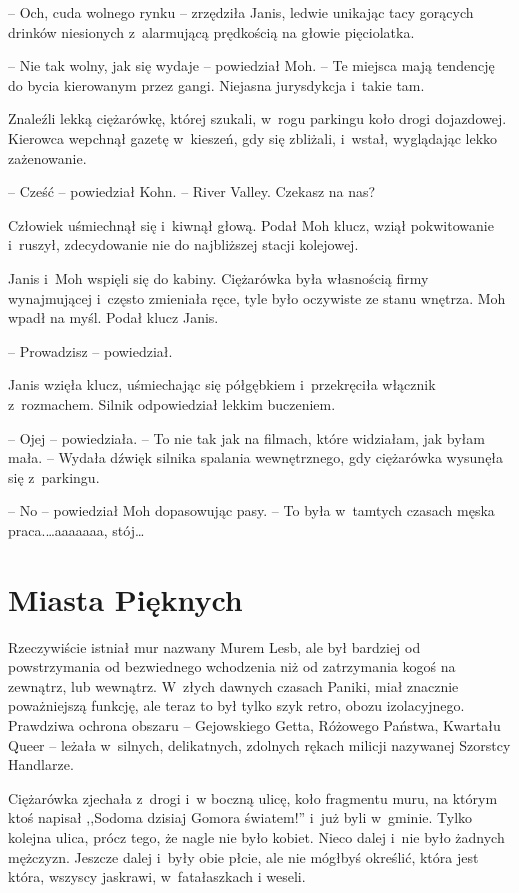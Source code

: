 \documentclass[oneside,polish,11pt,sfheadings]{mwbk}
\begin{document}
-- Och, cuda wolnego rynku -- zrzędziła Janis, ledwie unikając tacy
gorących drinków niesionych z~alarmującą prędkością na głowie
pięciolatka.

-- Nie tak wolny, jak się wydaje -- powiedział Moh. -- Te miejsca mają
tendencję do bycia kierowanym przez gangi. Niejasna jurysdykcja i~takie
tam.

Znaleźli lekką ciężarówkę, której szukali, w~rogu parkingu koło drogi
dojazdowej. Kierowca wepchnął gazetę w~kieszeń, gdy się zbliżali, i~wstał, wyglądając lekko zażenowanie.

-- Cześć -- powiedział Kohn. -- River Valley. Czekasz na nas?

Człowiek uśmiechnął się i~kiwnął głową. Podał Moh klucz, wziął
pokwitowanie i~ruszył, zdecydowanie nie do najbliższej stacji
kolejowej.

Janis i~Moh wspięli się do kabiny. Ciężarówka była własnością firmy
wynajmującej i~często zmieniała ręce, tyle było oczywiste ze stanu
wnętrza. Moh wpadł na myśl. Podał klucz Janis.

-- Prowadzisz -- powiedział.

Janis wzięła klucz, uśmiechając się półgębkiem i~przekręciła włącznik z~rozmachem. Silnik odpowiedział lekkim buczeniem.

-- Ojej -- powiedziała. -- To nie tak jak na filmach, które widziałam, jak
byłam mała. -- Wydała dźwięk silnika spalania wewnętrznego, gdy
ciężarówka wysunęła się z~parkingu.

-- No -- powiedział Moh dopasowując pasy. -- To była w~tamtych czasach
męska praca.\ldots aaaaaaa, stój\ldots

\chapter{Miasta Pięknych}

Rzeczywiście istniał mur nazwany Murem Lesb, ale był bardziej od
powstrzymania od bezwiednego wchodzenia niż od zatrzymania kogoś na
zewnątrz, lub wewnątrz. W~złych dawnych czasach Paniki, miał znacznie
poważniejszą funkcję, ale teraz to był tylko szyk retro, obozu
izolacyjnego. Prawdziwa ochrona obszaru -- Gejowskiego Getta, Różowego
Państwa, Kwartału Queer -- leżała w~silnych, delikatnych, zdolnych rękach
milicji nazywanej Szorstcy Handlarze.

Ciężarówka zjechała z~drogi i~w boczną ulicę, koło fragmentu muru, na
którym ktoś napisał ,,Sodoma dzisiaj Gomora światem!'' i~już byli w~gminie. Tylko kolejna ulica, prócz tego, że nagle nie było kobiet. Nieco
dalej i~nie było żadnych mężczyzn. Jeszcze dalej i~były obie płcie, ale
nie mógłbyś określić, która jest która, wszyscy jaskrawi, w~fatałaszkach
i weseli.
\end{document}
